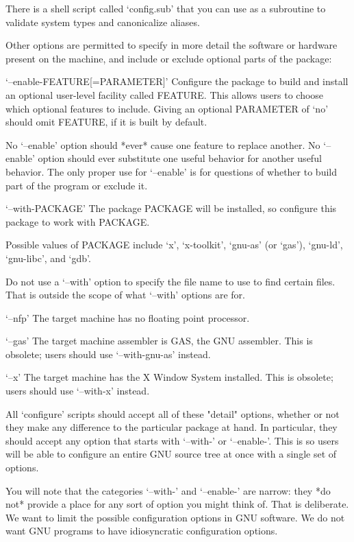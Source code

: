    There is a shell script called `config.sub' that you can use as a
subroutine to validate system types and canonicalize aliases.

   Other options are permitted to specify in more detail the software
or hardware present on the machine, and include or exclude optional
parts of the package:

`--enable-FEATURE[=PARAMETER]'
     Configure the package to build and install an optional user-level
     facility called FEATURE.  This allows users to choose which
     optional features to include.  Giving an optional PARAMETER of
     `no' should omit FEATURE, if it is built by default.

     No `--enable' option should *ever* cause one feature to replace
     another.  No `--enable' option should ever substitute one useful
     behavior for another useful behavior.  The only proper use for
     `--enable' is for questions of whether to build part of the program
     or exclude it.

`--with-PACKAGE'
     The package PACKAGE will be installed, so configure this package
     to work with PACKAGE.

     Possible values of PACKAGE include `x', `x-toolkit', `gnu-as' (or
     `gas'), `gnu-ld', `gnu-libc', and `gdb'.

     Do not use a `--with' option to specify the file name to use to
     find certain files.  That is outside the scope of what `--with'
     options are for.

`--nfp'
     The target machine has no floating point processor.

`--gas'
     The target machine assembler is GAS, the GNU assembler.  This is
     obsolete; users should use `--with-gnu-as' instead.

`--x'
     The target machine has the X Window System installed.  This is
     obsolete; users should use `--with-x' instead.

   All `configure' scripts should accept all of these "detail" options,
whether or not they make any difference to the particular package at
hand.  In particular, they should accept any option that starts with
`--with-' or `--enable-'.  This is so users will be able to configure
an entire GNU source tree at once with a single set of options.

   You will note that the categories `--with-' and `--enable-' are
narrow: they *do not* provide a place for any sort of option you might
think of.  That is deliberate.  We want to limit the possible
configuration options in GNU software.  We do not want GNU programs to
have idiosyncratic configuration options.

